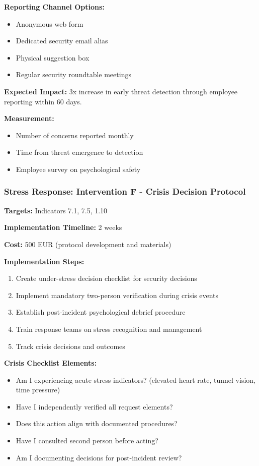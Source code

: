\documentclass[11pt,a4paper]{article}
\begin{document}
\textbf{Reporting Channel Options:}
\begin{itemize}
\item Anonymous web form
\item Dedicated security email alias
\item Physical suggestion box
\item Regular security roundtable meetings
\end{itemize}

\textbf{Expected Impact:} 3x increase in early threat detection through employee reporting within 60 days.

\textbf{Measurement:}
\begin{itemize}
\item Number of concerns reported monthly
\item Time from threat emergence to detection
\item Employee survey on psychological safety
\end{itemize}

\subsubsection{Stress Response: Intervention F - Crisis Decision Protocol}

\textbf{Targets:} Indicators 7.1, 7.5, 1.10

\textbf{Implementation Timeline:} 2 weeks

\textbf{Cost:} 500 EUR (protocol development and materials)

\textbf{Implementation Steps:}
\begin{enumerate}
\item Create under-stress decision checklist for security decisions
\item Implement mandatory two-person verification during crisis events
\item Establish post-incident psychological debrief procedure
\item Train response teams on stress recognition and management
\item Track crisis decisions and outcomes
\end{enumerate}

\textbf{Crisis Checklist Elements:}
\begin{itemize}
\item Am I experiencing acute stress indicators? (elevated heart rate, tunnel vision, time pressure)
\item Have I independently verified all request elements?
\item Does this action align with documented procedures?
\item Have I consulted second person before acting?
\item Am I documenting decisions for post-incident review?
\end{itemize}
\end{document}
